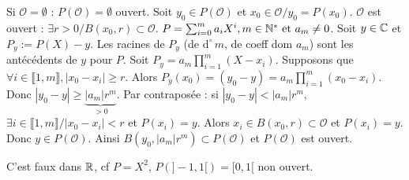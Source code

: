 \begin{solution}
Si $\mathcal{O} = \emptyset$ : $P(\mathcal{O}) = \emptyset$ ouvert.
Soit $y_0 \in P(\mathcal{O})$ et $x_0 \in \mathcal{O} / y_0 = P(x_0)$.
$\mathcal{O}$ est ouvert : $\exists r > 0 / B(x_0, r) \subset \mathcal{O}$.
$P = \sum_{i=0}^m a_i X^i, m \in \mathbb N^* \text{ et } a_m \neq 0$.
Soit $y \in \mathbb C$ et $P_y := P(X) - y$.
Les racines de $P_y$ (de $\mathrm{d}^\circ \, m$, de coeff dom $a_m$) sont les antécédents de $y$ pour $P$.
Soit $P_y = a_m \prod_{i=1}^m (X - x_i)$.
Supposons que $\forall i \in \llbracket 1, m \rrbracket, |x_0 - x_i| \geq r$.
Alors $P_y(x_0) = (y_0 - y) = a_m \prod_{i=1}^m (x_0 - x_i)$.
Donc $|y_0 - y| \geq \underbrace{|a_m| r^m}_{> 0}$.
Par contraposée : si $|y_0 - y| < |a_m| r^m$, $\exists i \in \llbracket 1, m \rrbracket / |x_0 - x_i| < r$ et $P(x_i) = y$.
Alors $x_i \in B(x_0, r) \subset \mathcal{O}$ et $P(x_i) = y$.
Donc $y \in P(\mathcal{O})$.
Ainsi $B(y_0, |a_m| r^m) \subset P(\mathcal{O})$ et $P(\mathcal{O})$ est ouvert.

\begin{remarkbox}
C'est faux dans $\mathbb R$, cf $P = X^2$, $P(]-1, 1[) = [0, 1[$ non ouvert.

\begin{center}
\end{center}
\end{remarkbox}
\end{solution}
